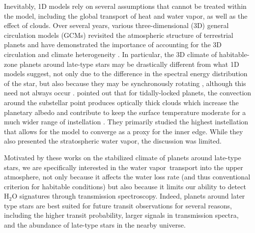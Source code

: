 \documentclass[11pt,numberedappendix,twocolappendix,]{emulateapj}
\def\water{H$_2$O }
\newcommand{\wv}{{\color{orange}water vapor\ }}
\begin{document}
Inevitably, 1D models rely on several assumptions that cannot be treated within the model, including the global transport of heat and water vapor, as well as the effect of clouds. 
Over several years, various three-dimensional (3D) general circulation models (GCMs) revisited the atmospheric structure of terrestrial planets and have demonstrated the importance of accounting for the 3D circulation and climate heterogeneity \citep[e.g.][]{Ishiwatari2002,Abe2011,Leconte2013a,Leconte2013b,Wolf2014,Wolf2015}. 
In particular, the 3D climate of habitable-zone planets around late-type stars may be drastically different from what 1D models suggest, not only due to the difference in the spectral energy distribution of the star, but also because they may be synchronously rotating \citep{Dole1964, Kasting1993}, although this need not always occur \citep{Goldreich1966,Leconte2015}.  
%
\citet{Yang2013} pointed out that for tidally-locked planets, the convection around the substellar point produces optically thick clouds which increase the planetary albedo and contribute to keep the surface temperature moderate for a much wider range of instellation \citep[see also][]{Yang2014,Way2015,Kopparapu2016}. 
They primarily studied the highest instellation that allows for the model to converge as a proxy for the inner edge. 
While they also presented the stratospheric water vapor, the discussion was limited. 

Motivated by these works on the stabilized climate of planets around late-type stars, we are specifically interested in the \wv transport into the upper atmosphere, not only because it affects the water loss rate (and thus conventional criterion for habitable conditions) but also because it limits our ability to detect \water signatures through transmission spectroscopy. 
%
Indeed, planets around later type stars are best suited for future transit observations for several reasons, including the higher transit probability, larger signals in transmission spectra, and the abundance of late-type stars in the nearby universe. 
\end{document}
